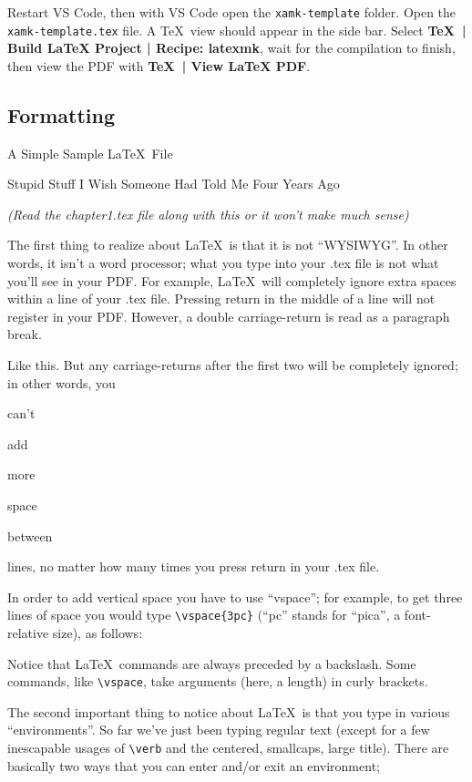 Restart VS Code, then with VS Code open the \texttt{xamk-template} folder.
Open the \texttt{xamk-template.tex} file.
A \TeX\ view should appear in the side bar.
Select \textbf{\TeX\ | Build LaTeX Project | Recipe: latexmk}, wait for the compilation to finish, then view the PDF with \textbf{\TeX\ | View LaTeX PDF}.

\subsection{Formatting}

{\centering\sc \large A Simple Sample \LaTeX\ File \parencite{formatting}\par}
\centerline{\sc Stupid Stuff I Wish Someone Had Told Me Four Years Ago}
\centerline{\it (Read the chapter1.tex file along with this or it won't make much sense)}

The first thing to realize about \LaTeX\ is that it is not ``WYSIWYG''.
In other words, it isn't a word processor; what you type into your .tex file is not what you'll see in your PDF.
For example, \LaTeX\ will      completely     ignore               extra    spaces    within                             a line of your .tex file.
Pressing return
in
the
middle
of
a
line
will not register in your PDF.
However, a double carriage-return is read as a paragraph break.

Like this.
But any carriage-returns after the first two will be completely ignored; in other words, you


can't

add






more




space


between




lines, no matter how many times you press return in your .tex file.

In order to add vertical space you have to use ``vspace''; for example, to get three lines of space you would type \verb|\vspace{3pc}| (``pc'' stands for ``pica'', a font-relative size), as follows:
\vspace{3pc}

Notice that \LaTeX\ commands are always preceded by a backslash.
Some commands, like \verb|\vspace|, take arguments (here, a length) in curly brackets.

The second important thing to notice about \LaTeX\ is that you type in various ``environments''.
So far we've just been typing regular text (except for a few inescapable usages of \verb|\verb| and the centered, smallcaps, large title).
There are basically two ways that you can enter and/or exit an environment;
\vspace{0pc}

